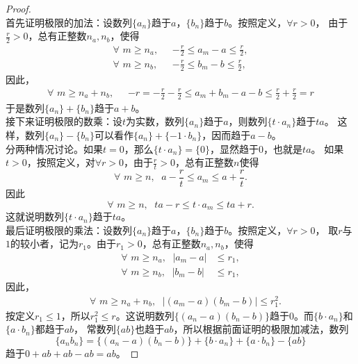 \documentclass[12pt,UTF8]{ctexbook}
\begin{document}
\begin{proof}
    \mbox{} \\
    首先证明极限的加法：设数列$\{a_n\}$趋于$a$，$\{b_n\}$趋于$b$。按照定义，$\forall r > 0$，
    由于$\frac{r}{2}>0$，总有正整数$n_a, n_b$，使得
    \begin{align*}
        \forall \,\, m \geqslant n_a, \;\,\, & - \frac{r}{2} \leqslant a_m - a \leqslant \frac{r}{2},  \\
        \forall \,\, m \geqslant n_b, \;\,\, & - \frac{r}{2} \leqslant b_m - b \leqslant \frac{r}{2},  
    \end{align*}
    因此，
    \begin{align*}
        \forall \,\, m \geqslant n_a + n_b, \;\,\, & -r = - \frac{r}{2} - \frac{r}{2} \leqslant a_m + b_m - a - b \leqslant \frac{r}{2} + \frac{r}{2} = r  
    \end{align*}
    于是数列$\{a_n\} + \{b_n\}$趋于$a + b$。\\
    接下来证明极限的数乘：设$t$为实数，数列$\{a_n\}$趋于$a$，则数列$\{t\cdot a_n\}$趋于$ta$。
    这样，数列$\{a_n\} - \{b_n\}$可以看作$\{a_n\} + \{-1\cdot b_n\}$，因而趋于$a - b$。\\
    分两种情况讨论。如果$t=0$，那么$\{t\cdot a_n\} = \{0\}$，显然趋于$0$，也就是$ta$。
    如果$t > 0$，按照定义，对$\forall r > 0$，由于$\frac{r}{t} > 0$，总有正整数$n$使得
    $$ \forall \,\, m \geqslant n, \;\,\, a - \frac{r}{t} \leqslant a_m \leqslant a + \frac{r}{t}. $$
    因此
    $$ \forall \,\, m \geqslant n, \;\,\, ta - r \leqslant t\cdot a_m \leqslant ta + r. $$
    这就说明数列$\{t\cdot a_n\}$趋于$ta$。\\
    最后证明极限的乘法：设数列$\{a_n\}$趋于$a$，$\{b_n\}$趋于$b$。按照定义，$\forall r > 0$，
    取$r$与$1$的较小者，记为$r_1$。由于$r_1>0$，总有正整数$n_a, n_b$，使得
    \begin{align*}
        \forall \,\, m \geqslant n_a, \;\,\, |a_m - a| & \leqslant r_1,  \\
        \forall \,\, m \geqslant n_b, \;\,\, | b_m - b| & \leqslant r_1,  
    \end{align*}
    因此，
    \begin{align*}
        \mbox{}\quad\forall \,\, m \geqslant n_a + n_b, \;\,\, |(a_m - a)(b_m - b) | \leqslant r_1^2.  
    \end{align*}
    按定义$r_1\leqslant 1$，所以$r_1^2 \leqslant r$。这说明数列$\{(a_n - a)(b_n - b)\}$趋于$0$。而$\{b\cdot a_n\}$和$\{a \cdot b_n\}$都趋于$ab$，
    常数列$\{ab\}$也趋于$ab$，所以根据前面证明的极限加减法，数列
    $$\{a_nb_n\} = \{(a_n - a)(b_n - b)\} + \{b\cdot a_n\} + \{a \cdot b_n\} - \{ab\}$$
    趋于$0 + ab + ab - ab = ab$。
\end{proof}
\end{document}
